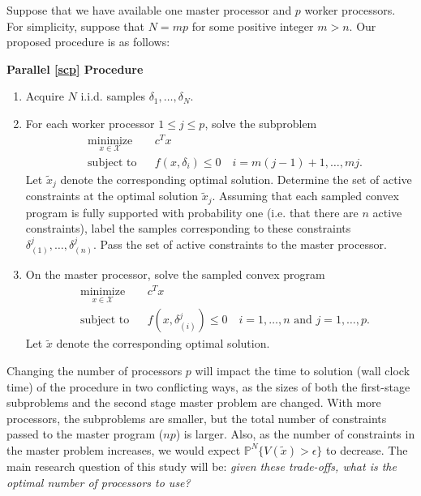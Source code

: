 \documentclass[12pt]{article}
\begin{document}
Suppose that we have available one master processor and $p$ worker processors.
For simplicity, suppose that $N = mp$ for some positive integer $m > n$.
Our proposed procedure is as follows:

\bigskip
\textbf{Parallel \ref{scp} Procedure}
\begin{enumerate}
\item Acquire $N$ i.i.d. samples $\delta_1, \ldots, \delta_N$.

\item For each worker processor $1 \leq j \leq p$, solve the subproblem
\begin{equation*}
\begin{aligned}
    & \underset{x \in \mathcal{X}}{\text{minimize}}
    & & c^T x \\
    & \text{subject to}
    & & f(x,\delta_i) \leq 0 \quad i = m(j-1) + 1, \ldots, mj.
\end{aligned}
\end{equation*}
Let $\tilde{x}_j$ denote the corresponding optimal solution.
Determine the set of active constraints at the optimal solution $\tilde{x}_j$.
Assuming that each sampled convex program is fully supported with probability one (i.e. that there are $n$ active constraints),
label the samples corresponding to these constraints $\delta_{(1)}^j, \ldots, \delta_{(n)}^j$.
Pass the set of active constraints to the master processor.

\item On the master processor, solve the sampled convex program
\begin{equation*}
\begin{aligned}
    & \underset{x \in \mathcal{X}}{\text{minimize}}
    & & c^T x \\
    & \text{subject to}
    & & f(x,\delta_{(i)}^j) \leq 0 \quad i = 1,\ldots,n \text{ and } j = 1,\ldots,p.
\end{aligned}
\end{equation*}
Let $\tilde{x}$ denote the corresponding optimal solution.
\end{enumerate}

Changing the number of processors $p$ will impact the time to solution (wall clock time) of the procedure in two conflicting ways, as the sizes of both the first-stage subproblems and the second stage master problem are changed.
With more processors, the subproblems are smaller, but the total number of constraints passed to the master program ($np$) is larger.
Also, as the number of constraints in the master problem increases, we would expect $\mathbb{P}^N\{V(\tilde{x}) > \epsilon\}$ to decrease.
The main research question of this study will be: \textit{given these trade-offs, what is the optimal number of processors to use?}
\end{document}

